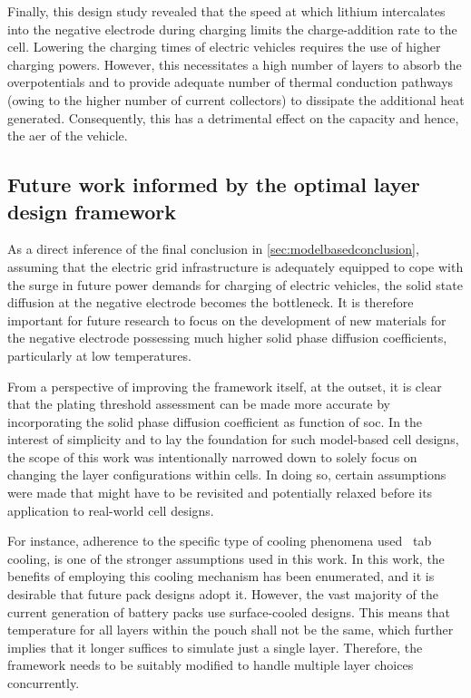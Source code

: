 Finally, this design study revealed that the speed at which lithium intercalates
into the negative  electrode during charging limits the  charge-addition rate to
the cell. Lowering  the charging times of electric vehicles  requires the use of
higher charging  powers. However, this necessitates  a high number of  layers to
absorb the overpotentials  and to provide adequate number  of thermal conduction
pathways (owing  to the higher  number of  current collectors) to  dissipate the
additional heat  generated. Consequently, this  has a detrimental effect  on the
capacity and hence, the \gls{aer} of the vehicle.

\subsection{Future work informed by  the optimal layer design framework}

\addlines[0.5]
As     a     direct     inference     of     the     final     conclusion     in
\cref{sec:modelbasedconclusion}, assuming that  the electric grid infrastructure
is  adequately equipped  to cope  with  the surge  in future  power demands  for
charging  of  electric vehicles,  the  solid  state  diffusion at  the  negative
electrode becomes the bottleneck. It  is therefore important for future research
to  focus  on the  development  of  new  materials  for the  negative  electrode
possessing much higher  solid phase diffusion coefficients,  particularly at low
temperatures.

From a perspective of improving the framework itself, at the outset, it is clear
that the plating threshold assessment can be made more accurate by incorporating
the solid phase diffusion coefficient as  function of \gls{soc}. In the interest
of simplicity and  to lay the foundation for such  model-based cell designs, the
scope of this  work was intentionally narrowed down to  solely focus on changing
the layer  configurations within  cells. In doing  so, certain  assumptions were
made  that  might have  to  be  revisited  and  potentially relaxed  before  its
application to real-world cell designs.

For instance, adherence  to the specific type of cooling  phenomena used \ie~tab
cooling, is one of the stronger assumptions used in this work. In this work, the
benefits of  employing this  cooling mechanism  has been  enumerated, and  it is
desirable that future  pack designs adopt it. However, the  vast majority of the
current generation of battery packs  use surface-cooled designs. This means that
temperature for all layers within the pouch shall not be the same, which further
implies that it longer suffices to  simulate just a single layer. Therefore, the
framework  needs  to be  suitably  modified  to  handle multiple  layer  choices
concurrently.

